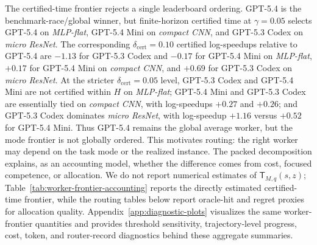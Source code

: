 \documentclass{article}
\begin{document}
{\color{green!50!black}
The certified-time frontier rejects a single leaderboard ordering.
GPT-5.4 is the benchmark-race/global winner, but finite-horizon certified time at \(\gamma=0.05\) selects GPT-5.4 on \textit{MLP-flat}, GPT-5.4 Mini on \textit{compact CNN}, and GPT-5.3 Codex on \textit{micro ResNet}.
The corresponding \(\delta_{\mathrm{cert}}=0.10\) certified log-speedups relative to GPT-5.4 are \(-1.13\) for GPT-5.3 Codex and \(-0.17\) for GPT-5.4 Mini on \textit{MLP-flat}, \(+0.17\) for GPT-5.4 Mini on \textit{compact CNN}, and \(+0.69\) for GPT-5.3 Codex on \textit{micro ResNet}.
At the stricter \(\delta_{\mathrm{cert}}=0.05\) level, GPT-5.3 Codex and GPT-5.4 Mini are not certified within \(H\) on \textit{MLP-flat}; GPT-5.4 Mini and GPT-5.3 Codex are essentially tied on \textit{compact CNN}, with log-speedups \(+0.27\) and \(+0.26\); and GPT-5.3 Codex dominates \textit{micro ResNet}, with log-speedup \(+1.16\) versus \(+0.52\) for GPT-5.4 Mini.
Thus GPT-5.4 remains the global average worker, but the mode frontier is not globally ordered.
This motivates routing: the right worker may depend on the task mode or the realized instance.
The packed decomposition explains, as an accounting model, whether the difference comes from cost, focused competence, or allocation.
We do not report numerical estimates of \(\mathsf T_{M,q}(s,z)\); Table~\ref{tab:worker-frontier-accounting} reports the directly estimated certified-time frontier, while the routing tables below report oracle-hit and regret proxies for allocation quality.
Appendix~\ref{app:diagnostic-plots} visualizes the same worker-frontier quantities and provides threshold sensitivity, trajectory-level progress, cost, token, and router-record diagnostics behind these aggregate summaries.
}
\end{document}
